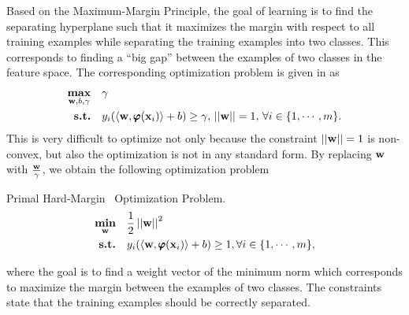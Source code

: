 {Based on the Maximum-Margin Principle, the goal of learning is to find the separating hyperplane such that it maximizes the margin with respect to all training examples while separating the training examples into two classes.
This corresponds to finding a ``big gap'' between the examples of two classes in the feature space.
The corresponding optimization problem is given in \citep{Bishop07} as
\begin{align*}
	\underset{\mathbf {w},b,\gamma}{\textbf{max}} &\quad \gamma\\
	\textbf{s.t.} &\quad y_i(\langle \mathbf {w}, \pmb \varphi(\mathbf {x}_i) \rangle+b) \ge \gamma, \, \left|\left| \mathbf {w} \right|\right|=1, \, \forall i\in\{1,\cdots,m\}.
\end{align*}
This is very difficult to optimize not only because the constraint $\left|\left| \mathbf {w} \right|\right|=1$ is non-convex, but also the optimization is not in any standard form.
By replacing $\mathbf {w}$ with $\frac{\mathbf {w}}{\gamma}$, we obtain the following optimization problem

\begin{definition}{Primal Hard-Margin \svm\ Optimization Problem.}\label{hardsvmprimal}
	\begin{align*}
		\underset{\mathbf {w}}{\textbf{min}} & \quad\frac{1}{2}\left|\left| \mathbf {w} \right|\right|^2\\
		\textbf{s.t.} & \quad y_i(\langle \mathbf {w}, \pmb \varphi(\mathbf {x}_i) \rangle + b) \ge 1, \forall i\in\{1,\cdots,m\},
	\end{align*}
\end{definition}
\noindent
where the goal is to find a weight vector of the minimum norm which corresponds to maximize the margin between the examples of two classes.
The constraints state that the training examples should be correctly separated.

}
